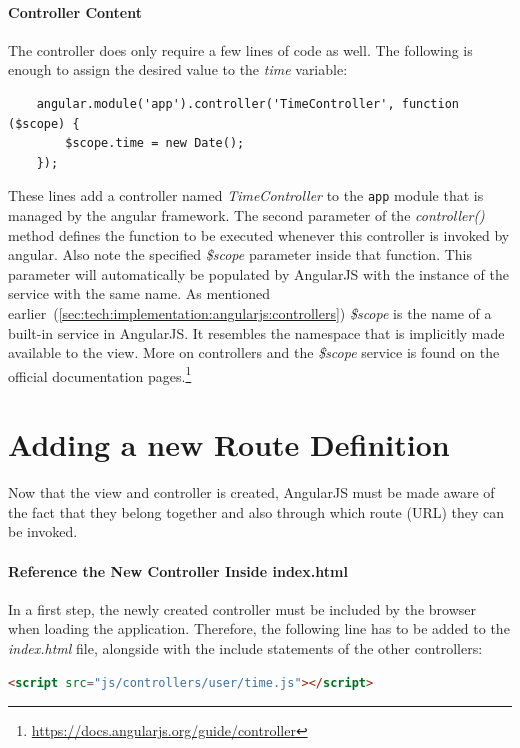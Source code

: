 \documentclass[nochapterpage,nopartpage,noheadingspace,numbersubsubsec,bigchapter,colorback,accentcolor=tud9c,10pt]{tudreport}
\begin{document}
  \paragraph{Controller Content}
    The controller does only require a few lines of code as well. The following is enough to assign the desired value to the \emph{time} variable:
        \begin{lstlisting}
    angular.module('app').controller('TimeController', function ($scope) {
        $scope.time = new Date();
    });
        \end{lstlisting}
    These lines add a controller named \emph{TimeController} to the \texttt{app} module that is managed by the angular framework. The second parameter of the \emph{controller()} method defines the function to be executed whenever this controller is invoked by angular. Also note the specified \emph{\$scope} parameter inside that function. This parameter will automatically be populated by AngularJS with the instance of the service with the same name. As mentioned earlier~(\ref{sec:tech:implementation:angularjs:controllers}) \emph{\$scope} is the name of a built-in service in AngularJS. It resembles the namespace that is implicitly made available to the view. More on controllers and the \emph{\$scope} service is found on the official documentation pages.\footnote{\url{https://docs.angularjs.org/guide/controller}}

  \section{Adding a new Route Definition}
  \label{sec:tech:handson:add-route}

    Now that the view and controller is created, AngularJS must be made aware of the fact that they belong together and also through which route (URL) they can be invoked.

  \paragraph{Reference the New Controller Inside index.html}
    In a first step, the newly created controller must be included by the browser when loading the application. Therefore, the following line has to be added to the \emph{index.html} file, alongside with the include statements of the other controllers:
        \begin{lstlisting}[language=html]
    <script src="js/controllers/user/time.js"></script>
        \end{lstlisting}
\end{document}
